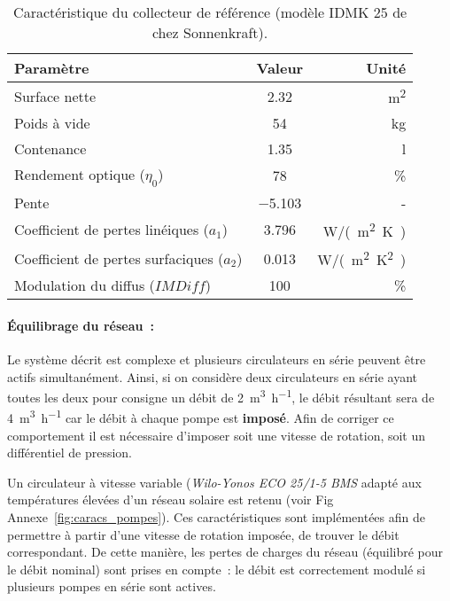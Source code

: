 \begin{table}
\centering
\caption{Caractéristique du collecteur de référence (modèle IDMK 25 de chez Sonnenkraft).}
\label{tab:idmk_specs}
\begin{tabular}{lcr}
    \toprule
    Paramètre                                   & Valeur         & Unité                 \\
    \midrule
    Surface nette                               & \num{2.32}           & \si{m^{2}}            \\
    Poids à vide                                & \num{54}             & \si{kg}               \\
    Contenance                                  & \num{1.35}           & \si{l}                \\
    Rendement optique ($\eta_{0}$)              & \num{78}             & \si{\%}               \\
    Pente                                       & \num{-5.103}         & -                     \\
    Coefficient de pertes linéiques ($a_{1}$)   & \num{3.796}          & \si{W/(m^{2}.K)}      \\
    Coefficient de pertes surfaciques ($a_{2}$) & \num{0.013}          & \si{W/(m^{2}.K^{2})}  \\
    Modulation du diffus ($IMDiff$)             & \num{100}            & \si{\%}               \\
    \bottomrule
\end{tabular}
\end{table}

\paragraph{Équilibrage du réseau~:} %
\label{par:equilibrage_du_reseau}
Le système décrit est complexe et plusieurs circulateurs en série peuvent être actifs
simultanément. Ainsi, si on considère deux circulateurs en série ayant toutes les deux pour
consigne un débit de \SI[per- mode=symbol]{2}{\meter\cubed\per\hour}, le débit résultant
sera de \SI[per-mode=symbol]{4}{\meter\cubed\per\hour} car le débit à chaque pompe est
\textbf{imposé}. Afin de corriger ce comportement il est nécessaire d’imposer soit une
vitesse de rotation, soit un différentiel de pression.

Un circulateur à vitesse variable (\emph{Wilo-Yonos ECO 25/1-5 BMS} adapté aux
températures élevées d’un réseau solaire est retenu (voir Fig Annexe~\ref{fig:caracs_pompes}).
Ces caractéristiques sont implémentées afin de permettre à partir d’une vitesse de
rotation imposée, de trouver le débit correspondant. De cette manière, les pertes de
charges du réseau (équilibré pour le débit nominal) sont prises en compte~: le débit est
correctement modulé si plusieurs pompes en série sont actives.


